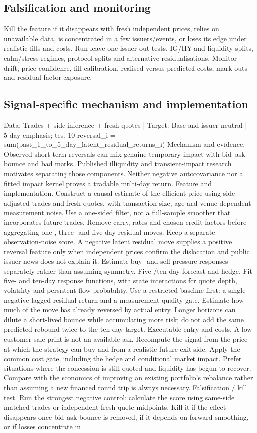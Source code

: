 \documentclass[10pt]{article}
\begin{document}
\subsection{Falsification and monitoring}
Kill the feature if it disappears with fresh independent prices, relies on unavailable data, is concentrated in a few issuers/events, or loses its edge under realistic fills and costs. Run leave-one-issuer-out tests, IG/HY and liquidity splits, calm/stress regimes, protocol splits and alternative residualisations. Monitor drift, price confidence, fill calibration, realised versus predicted costs, mark-outs and residual factor exposure.
\subsection{Signal-specific mechanism and implementation}
Data: Trades + side inference + fresh quotes  |  Target: Base and issuer-neutral  |  5-day emphasis; test 10 reversal\_i = -sum(past\_1\_to\_5\_day\_latent\_residual\_returns\_i) Mechanism and evidence.  Observed short-term reversals can mix genuine temporary impact with bid--ask bounce and bad marks. Published illiquidity and transient-impact research motivates separating those components. Neither negative autocovariance nor a fitted impact kernel proves a tradable multi-day return. Feature and implementation.  Construct a causal estimate of the efficient price using side-adjusted trades and fresh quotes, with transaction-size, age and venue-dependent measurement noise. Use a one-sided filter, not a full-sample smoother that incorporates future trades. Remove carry, rates and chosen credit factors before aggregating one-, three- and five-day residual moves. Keep a separate observation-noise score. A negative latent residual move supplies a positive reversal feature only when independent prices confirm the dislocation and public issuer news does not explain it. Estimate buy- and sell-pressure responses separately rather than assuming symmetry. Five-/ten-day forecast and hedge.  Fit five- and ten-day response functions, with state interactions for quote depth, volatility and persistent-flow probability. Use a restricted baseline first: a single negative lagged residual return and a measurement-quality gate. Estimate how much of the move has already reversed by actual entry. Longer horizons can dilute a short-lived bounce while accumulating more risk; do not add the same predicted rebound twice to the ten-day target. Executable entry and costs.  A low customer-sale print is not an available ask. Recompute the signal from the price at which the strategy can buy and from a realistic future exit side. Apply the common cost gate, including the hedge and conditional market impact. Prefer situations where the concession is still quoted and liquidity has begun to recover. Compare with the economics of improving an existing portfolio’s rebalance rather than assuming a new financed round trip is always necessary. Falsification / kill test.  Run the strongest negative control: calculate the score using same-side matched trades or independent fresh quote midpoints. Kill it if the effect disappears once bid--ask bounce is removed, if it depends on forward smoothing, or if losses concentrate in 
\end{document}
